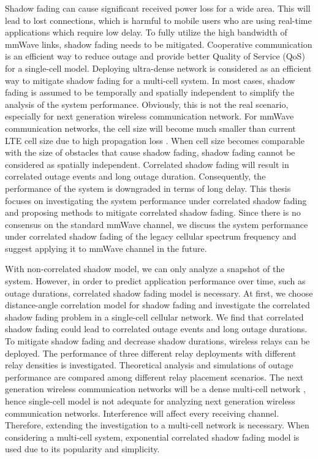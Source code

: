 \par Shadow fading can cause significant received power loss for a wide area. This will lead to lost connections, which is harmful to mobile users who are using real-time applications which require low delay. To fully utilize the high bandwidth of mmWave links, shadow fading needs to be mitigated. Cooperative communication is an efficient way to reduce outage and provide better Quality of Service (QoS) for a single-cell model. Deploying ultra-dense network is considered as an efficient way to mitigate shadow fading for a multi-cell system. In most cases, shadow fading is assumed to be temporally and spatially independent to simplify the analysis of the system performance. Obviously, this is not the real scenario, especially for next generation wireless communication network. For mmWave communication networks, the cell size will become much smaller than current LTE cell size due to high propagation loss \cite{rangan2014millimeter}. When cell size becomes comparable with the size of obstacles that cause shadow fading, shadow fading cannot be considered as spatially independent. Correlated shadow fading will result in correlated outage events and long outage duration. Consequently, the performance of the system is downgraded in terms of long delay. This thesis focuses on investigating the system performance under correlated shadow fading and proposing methods to mitigate correlated shadow fading. Since there is no consensus on the standard mmWave channel, we discuss the system performance under correlated shadow fading of the legacy cellular spectrum frequency and suggest applying it to mmWave channel in the future. 

\par With non-correlated shadow model, we can only analyze a snapshot of the system. However, in order to predict application performance over time, such as outage durations, correlated shadow fading model is necessary. At first, we choose distance-angle correlation model \cite{szyszkowicz2010feasibility} for shadow fading and investigate the correlated shadow fading problem in a single-cell cellular network. We find that correlated shadow fading could lead to correlated outage events and long outage durations.  To mitigate shadow fading and decrease shadow durations, wireless relays can be deployed. The performance of three different relay deployments with different relay densities is investigated. Theoretical analysis and simulations of outage performance are compared among different relay placement scenarios. The next generation wireless communication networks will be a dense multi-cell network \cite{rangan2014millimeter}, hence single-cell model is not adequate for analyzing next generation wireless communication networks. Interference will affect every receiving channel. Therefore, extending the investigation to a multi-cell network is necessary. When considering a multi-cell system, exponential correlated shadow fading model is used due to its popularity and simplicity. 

